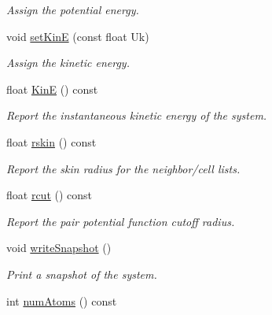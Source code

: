 \begin{DoxyCompactItemize}
\begin{DoxyCompactList}\small\item\em Assign the potential energy. \end{DoxyCompactList}\item 
\hypertarget{classsystem_definition_a2b2c236698886bd1d106be802b987b61}{void \hyperlink{classsystem_definition_a2b2c236698886bd1d106be802b987b61}{set\-Kin\-E} (const float Uk)}\label{classsystem_definition_a2b2c236698886bd1d106be802b987b61}

\begin{DoxyCompactList}\small\item\em Assign the kinetic energy. \end{DoxyCompactList}\item 
\hypertarget{classsystem_definition_a6ef7fed76c5774d85f3c78943df2ed90}{float \hyperlink{classsystem_definition_a6ef7fed76c5774d85f3c78943df2ed90}{Kin\-E} () const }\label{classsystem_definition_a6ef7fed76c5774d85f3c78943df2ed90}

\begin{DoxyCompactList}\small\item\em Report the instantaneous kinetic energy of the system. \end{DoxyCompactList}\item 
\hypertarget{classsystem_definition_a343c8b17c052215a32412ec3df4f1d9a}{float \hyperlink{classsystem_definition_a343c8b17c052215a32412ec3df4f1d9a}{rskin} () const }\label{classsystem_definition_a343c8b17c052215a32412ec3df4f1d9a}

\begin{DoxyCompactList}\small\item\em Report the skin radius for the neighbor/cell lists. \end{DoxyCompactList}\item 
\hypertarget{classsystem_definition_acacd88aac7d451bdcf9779ae8c5a95c7}{float \hyperlink{classsystem_definition_acacd88aac7d451bdcf9779ae8c5a95c7}{rcut} () const }\label{classsystem_definition_acacd88aac7d451bdcf9779ae8c5a95c7}

\begin{DoxyCompactList}\small\item\em Report the pair potential function cutoff radius. \end{DoxyCompactList}\item 
void \hyperlink{classsystem_definition_ae7be021831635d359872d046f58b337a}{write\-Snapshot} ()
\begin{DoxyCompactList}\small\item\em Print a snapshot of the system. \end{DoxyCompactList}\item 
\hypertarget{classsystem_definition_ae8d3c2df2d56241cee03fcc4e2026ae0}{int \hyperlink{classsystem_definition_ae8d3c2df2d56241cee03fcc4e2026ae0}{num\-Atoms} () const }\label{classsystem_definition_ae8d3c2df2d56241cee03fcc4e2026ae0}


\end{DoxyCompactItemize}
